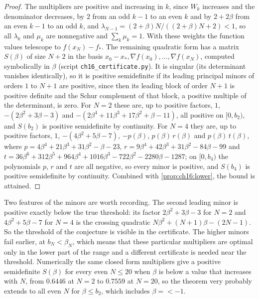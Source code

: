 \begin{proof}
The multipliers are positive and increasing in $k$, since $W_k$ increases and the
denominator decreases, by $2$ from an odd $k-1$ to an even $k$ and by $2+2\beta$ from an
even $k-1$ to an odd $k$, and $\lambda_{N-1}=(2+\beta)N/((2+\beta)N+2)<1$, so all $\lambda_k$ and $\mu_k$ are nonnegative and $\sum_k\mu_k=1$. With these
weights the function values telescope to $f(x_N)-f_*$. The remaining quadratic
form has a matrix $S(\beta)$ of size $N+2$ in the basis $x_0-x_*,\nabla f(x_0),\dots,\nabla f(x_N)$,
computed symbolically in $\beta$ (script \texttt{ch16\_certificate.py}). It is
singular (its determinant vanishes identically), so it is positive semidefinite
if its leading principal minors of orders $1$ to $N+1$ are positive, since then its leading block of order $N+1$ is positive definite and the Schur complement of that block, a positive multiple of the determinant, is zero. For
$N=2$ these are, up to positive factors, $1$, $-(2\beta^2+3\beta-3)$ and
$-(2\beta^4+11\beta^3+17\beta^2+\beta-11)$, all positive on $[0,b_2)$, and $S(b_2)$ is positive semidefinite by continuity. For $N=4$ they
are, up to positive factors, $1$, $-(4\beta^2+5\beta-7)$, $-p(\beta)$,
$p(\beta)\,r(\beta)$ and $p(\beta)\,t(\beta)$, where $p=4\beta^4+21\beta^3+31\beta^2-\beta-23$,
$r=9\beta^4+42\beta^3+31\beta^2-84\beta-99$ and
$t=36\beta^6+312\beta^5+964\beta^4+1016\beta^3-722\beta^2-2280\beta-1287$; on $[0,b_4)$ the
polynomials $p$, $r$ and $t$ are all negative, so every minor is positive, and $S(b_4)$ is positive semidefinite by continuity.
Combined with \cref{prop:ch16:lower}, the bound is attained.
\end{proof}

Two features of the minors are worth recording. The second leading minor is
positive exactly below the true threshold: its factor $2\beta^2+3\beta-3$ for
$N=2$ and $4\beta^2+5\beta-7$ for $N=4$ is the crossing quadratic
$N\beta^2+(N+1)\beta-(2N-1)$. So the threshold of the conjecture is visible in the
certificate. The higher minors fail earlier, at $b_N<\beta_N$, which means that
these particular multipliers are optimal only in the lower part of the range
and a different certificate is needed near the threshold. Numerically the same
closed form multipliers give a positive semidefinite $S(\beta)$ for every even
$N\le20$ when $\beta$ is below a value that increases with $N$, from $0.6446$ at
$N=2$ to $0.7559$ at $N=20$, so the theorem very probably extends to all even
$N$ for $\beta\le b_2$, which includes $\beta=\lt-1$.

